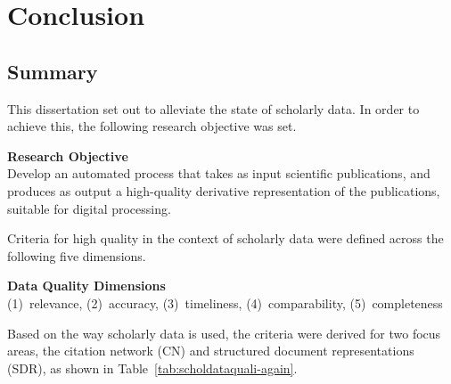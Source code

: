 \chapter{Conclusion}
\label{chp:conclusion}

\section{Summary}

This dissertation set out to alleviate the state of scholarly data. In order to achieve this, the following research objective was set.

\begin{infobox-objective}
\textbf{Research Objective}\\
Develop an automated process that takes as input scientific publications, and produces as output a high-quality derivative representation of the publications, suitable for digital processing.
\end{infobox-objective}

Criteria for high quality in the context of scholarly data were defined across the following five dimensions.%

\begin{infobox-progress}
      \textbf{Data Quality Dimensions}\\
       (1)~relevance, (2)~accuracy, (3)~timeliness, (4)~comparability, (5)~completeness
\end{infobox-progress}

Based on the way scholarly data is used, the criteria were derived for two focus areas, the citation network (CN) and structured document representations (SDR), as shown in Table~\ref{tab:scholdataquali-again}. %


